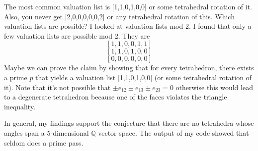 \documentclass[12pt,reqno]{amsart}
\newcommand{\Q}{\mathbb{Q}}
\theoremstyle{definition}
\theoremstyle{remark}
\begin{document}
The most common valuation list is [1,1,0,1,0,0]
or some tetrahedral rotation of it. Also, you never get [2,0,0,0,0,0,2] or any
tetrahedral rotation of this.
Which valuation lists are possible? I looked at valuation lists mod 2. I found that only a 
few valuation lists are possible mod 2. They are
$$
  [1,1,0,0,1,1]
$$
$$
  [1,1,0,1,0,0]
$$
$$
  [0,0,0,0,0,0]
$$
Maybe we can prove the claim
by showing that for every tetrahedron, there exists a prime $p$ that 
yields a valuation list [1,1,0,1,0,0] (or some tetrahedral rotation of it). Note that it's not possible that 
$\pm e_{12}\pm e_{13}\pm e_{23}=0$ otherwise this would lead to a degenerate tetrahedron because
one of the faces violates the triangle inequality.

In general, my findings support the conjecture that there are no tetrahedra whose angles
span a 5-dimensional $\Q$ vector space. The output of my code showed that seldom does
a prime pass. 
\end{document}
